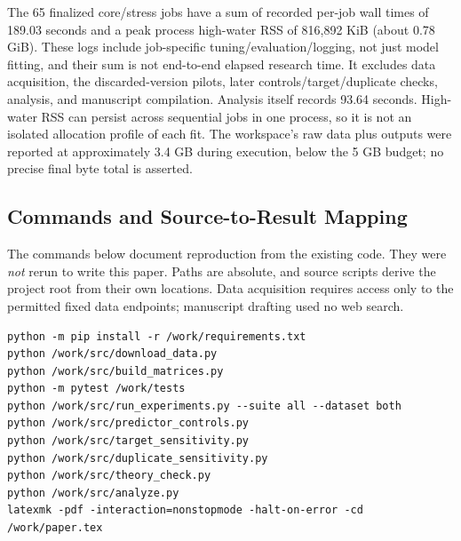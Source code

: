\documentclass{article}
\begin{document}
The 65 finalized core/stress jobs have a sum of recorded per-job wall times of 189.03 seconds and a peak process high-water RSS of 816,892 KiB (about 0.78 GiB). These logs include job-specific tuning/evaluation/logging, not just model fitting, and their sum is not end-to-end elapsed research time. It excludes data acquisition, the discarded-version pilots, later controls/target/duplicate checks, analysis, and manuscript compilation. Analysis itself records 93.64 seconds. High-water RSS can persist across sequential jobs in one process, so it is not an isolated allocation profile of each fit. The workspace's raw data plus outputs were reported at approximately 3.4 GB during execution, below the 5 GB budget; no precise final byte total is asserted.

\subsection{Commands and Source-to-Result Mapping}
The commands below document reproduction from the existing code. They were \emph{not} rerun to write this paper. Paths are absolute, and source scripts derive the project root from their own locations. Data acquisition requires access only to the permitted fixed data endpoints; manuscript drafting used no web search.
\begin{verbatim}
python -m pip install -r /work/requirements.txt
python /work/src/download_data.py
python /work/src/build_matrices.py
python -m pytest /work/tests
python /work/src/run_experiments.py --suite all --dataset both
python /work/src/predictor_controls.py
python /work/src/target_sensitivity.py
python /work/src/duplicate_sensitivity.py
python /work/src/theory_check.py
python /work/src/analyze.py
latexmk -pdf -interaction=nonstopmode -halt-on-error -cd /work/paper.tex
\end{verbatim}
\end{document}
